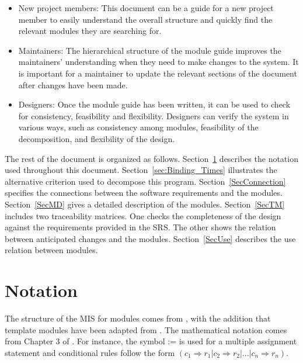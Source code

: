 \documentclass[12pt, titlepage]{article}
\begin{document}
\begin{itemize}
\item New project members: This document can be a guide for a new project member
  to easily understand the overall structure and quickly find the
  relevant modules they are searching for.
\item Maintainers: The hierarchical structure of the module guide improves the
  maintainers' understanding when they need to make changes to the system. It is
  important for a maintainer to update the relevant sections of the document
  after changes have been made.
\item Designers: Once the module guide has been written, it can be used to
  check for consistency, feasibility and flexibility. Designers can verify the
  system in various ways, such as consistency among modules, feasibility of the
  decomposition, and flexibility of the design.
\end{itemize}

The rest of the document is organized as follows. Section~\ref{sec:Notation} 
describes the notation used throughout this document. 
Section~\ref{sec:Binding_Times} illustrates the alternative criterion used to 
decompose this program.
Section~\ref{SecConnection} specifies the connections between the software 
requirements and the modules. Section~\ref{SecMD} gives a detailed description 
of the modules. Section~\ref{SecTM} includes two traceability matrices. 
One checks the completeness of the design against the requirements provided in 
the SRS. The other shows the relation between anticipated changes and the 
modules. Section~\ref{SecUse} describes the use relation between modules.

\section{Notation}\label{sec:Notation}


The structure of the MIS for modules comes from \citet{HoffmanAndStrooper1995},
with the addition that template modules have been adapted from
\cite{GhezziEtAl2003}.  The mathematical notation comes from Chapter 3 of
\citet{HoffmanAndStrooper1995}.  For instance, the symbol := is used for a
multiple assignment statement and conditional rules follow the form $(c_1
\Rightarrow r_1 | c_2 \Rightarrow r_2 | ... | c_n \Rightarrow r_n )$.
\end{document}
